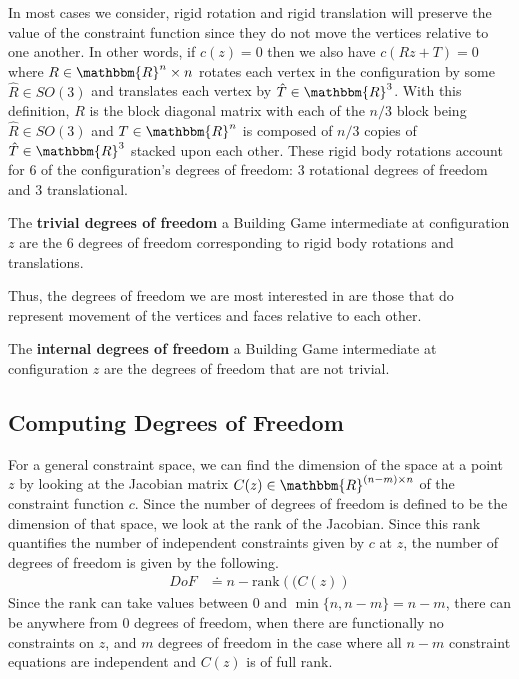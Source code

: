 In most cases we consider, rigid rotation and rigid translation will preserve the value of the constraint function since they do not move the vertices relative to one another. In other words, if $c(z) = 0$ then we also have $c(Rz + T) = 0$ where $R \in \mathbbm{R}^{n}\times n$ rotates each vertex in the configuration by some $\hat{R} \in SO(3)$ and translates each vertex by $\hat{T} \in \mathbbm{R}^3$. With this definition, $R$ is the block diagonal matrix with each of the $n/3$ block being $\hat{R} \in SO(3)$ and $T \in \mathbbm{R}^n$ is composed of $n/3$ copies of $\hat{T} \in \mathbbm{R}^3$ stacked upon each other. These rigid body rotations account for $6$ of the configuration's degrees of freedom: $3$ rotational degrees of freedom and $3$ translational.
\begin{mydef}
The \textbf{trivial degrees of freedom} a Building Game intermediate at configuration $z$ are the $6$ degrees of freedom corresponding to rigid body rotations and translations.
\end{mydef}
Thus, the degrees of freedom we are most interested in are those that do represent movement of the vertices and faces relative to each other. 
\begin{mydef}
The \textbf{internal degrees of freedom} a Building Game intermediate at configuration $z$ are the degrees of freedom that are not trivial.
\end{mydef}

\subsection{Computing Degrees of Freedom}

For a general constraint space, we can find the dimension of the space at a point $z$ by looking at the Jacobian matrix $C(z) \in \mathbbm{R}^{(n-m)\times n}$ of the constraint function $c$. Since the number of degrees of freedom is defined to be the dimension of that space, we look at the rank of the Jacobian. Since this rank quantifies the number of independent constraints given by $c$ at $z$, the number of degrees of freedom is given by the following.
\begin{align}
DoF &\doteq n - \text{rank}\left((C(z)\right)
\end{align}
Since the rank can take values between $0$ and $\min\{n,n-m\} = n-m$, there can be anywhere from $0$ degrees of freedom, when there are functionally no constraints on $z$, and $m$ degrees of freedom in the case where all $n-m$ constraint equations are independent and $C(z)$ is of full rank. 

